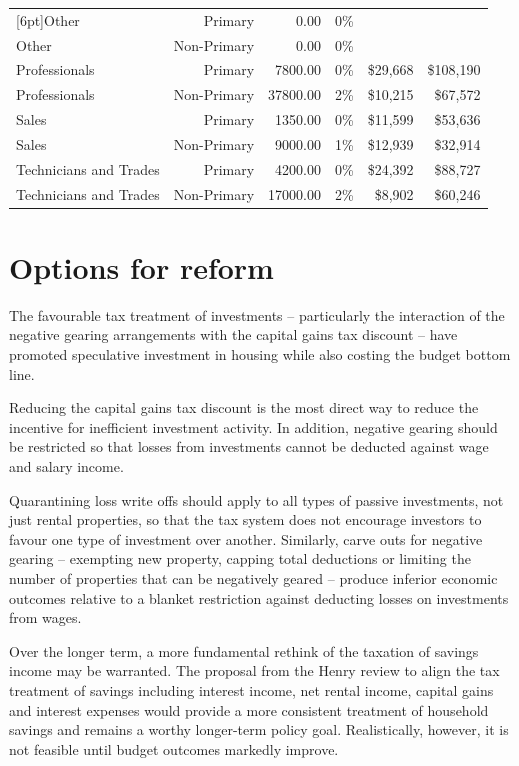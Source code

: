 \documentclass{grattan}\usepackage[]{graphicx}\usepackage[]{color}
\begin{document}
\begin{table}
\begin{tabular}{lrrrrr}
   [6pt]Other & Primary & 0.00 & 0\% &  &  \\ 
  Other & Non-Primary & 0.00 & 0\% &  &  \\ 
   [6pt]Professionals & Primary & 7800.00 & 0\% & \$29,668 & \$108,190 \\ 
  Professionals & Non-Primary & 37800.00 & 2\% & \$10,215 & \$67,572 \\ 
   [6pt]Sales & Primary & 1350.00 & 0\% & \$11,599 & \$53,636 \\ 
  Sales & Non-Primary & 9000.00 & 1\% & \$12,939 & \$32,914 \\ 
   [6pt]Technicians and Trades & Primary & 4200.00 & 0\% & \$24,392 & \$88,727 \\ 
  Technicians and Trades & Non-Primary & 17000.00 & 2\% & \$8,902 & \$60,246 \\ 
   \bottomrule
\end{tabular}

\end{table}

\chapter{Options for reform}
The favourable tax treatment of investments -- particularly the interaction of the negative gearing arrangements with the capital gains tax discount -- have promoted speculative investment in housing while also costing the budget bottom line. 

Reducing the capital gains tax discount is the most direct way to reduce the incentive for inefficient investment activity. In addition, negative gearing should be restricted so that losses from investments cannot be deducted against wage and salary income. 

Quarantining loss write offs should apply to all types of passive investments, not just rental properties, so that the tax system does not encourage investors to favour one type of investment over another. Similarly, carve outs for negative gearing -- exempting new property, capping total deductions or limiting the number of properties that can be negatively geared -- produce inferior economic outcomes relative to a blanket restriction against deducting losses on investments from wages.

Over the longer term, a more fundamental rethink of the taxation of savings income may be warranted. The proposal from the Henry review to align the tax treatment of savings including interest income, net rental income, capital gains and interest expenses would provide a more consistent treatment of household savings and remains a worthy longer-term policy goal.  Realistically, however, it is not feasible until budget outcomes markedly improve.
\end{document}
